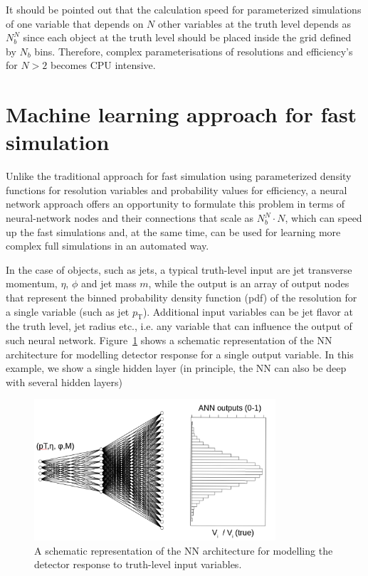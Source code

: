 \documentclass[showpacs,showkeys,preprint,prd,nofootinbib,linenumbers,12pt]{revtex4-1}
\def\pt{\ensuremath{p_{\mathrm{T}}}}
\begin{document}
It should be pointed out that the calculation speed for parameterized simulations of one variable that depends on $N$ other variables at the truth level depends  as $N_b^N$ since each object at the truth level should be placed inside the grid defined by $N_b$ bins. Therefore, complex parameterisations of resolutions and efficiency's for $N>2$ becomes CPU intensive. 

\section{Machine learning approach for fast simulation}

Unlike the traditional approach for fast simulation using parameterized density functions for resolution variables and probability values for efficiency, a neural network approach offers an opportunity to formulate this problem in terms of neural-network nodes and their connections that scale as $N_b^N \cdot N$, which can speed up the fast simulations and, at the same time, can be used for learning more complex full simulations in an automated way.

In the case of objects, such as jets, a typical truth-level input are jet transverse momentum, $\eta$, $\phi$ and jet mass $m$, while the output
is an array of output nodes that represent the binned probability density function (pdf) of the resolution for a single variable (such as jet \pt). Additional input variables can be jet flavor at the truth level, jet radius etc., i.e. any variable that 
can influence the output of such neural network. Figure~\ref{ann_example} shows a schematic representation of the NN architecture for modelling detector response for a single output variable. In this example, we show a single hidden layer (in principle, the NN can also be deep with several hidden layers)

\begin{figure}[h]
  \includegraphics[width=0.8\textwidth]{figures/intro/nn_example.png}
  \caption{A schematic representation of the NN architecture for modelling the detector response to truth-level input variables.}
  \label{ann_example}
\end{figure}
\end{document}
